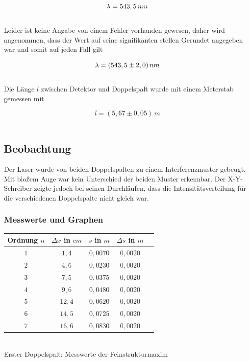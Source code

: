 \documentclass{article}
\begin{document}
\begin{equation}
\lambda = 543,5\,nm
\notag
\end{equation}\\

Leider ist keine Angabe von einem Fehler vorhanden gewesen, daher wird angenommen, dass der Wert auf seine signifikanten stellen Gerundet  angegeben war und somit auf jeden Fall gilt 

\begin{equation}
\lambda = (543,5 \pm 2,0)\,nm
\notag
\end{equation}\\

Die Länge \(l\) zwischen Detektor und Doppelspalt wurde mit einem Meterstab gemessen mit

\begin{equation}
l = (5,67 \pm 0,05)\, m
\end{equation}\\

\subsection{Beobachtung}
Der Laser wurde von beiden Doppelspalten zu einem Interferenzmuster gebeugt. Mit bloßem Auge war kein Unterschied der beiden Muster erkennbar. Der X-Y-Schreiber zeigte jedoch bei seinen Durchläufen, dass die Intensitätsverteilung für die verschiedenen Doppelspalte nicht gleich war.

\subsubsection{Messwerte und Graphen}

\begin{center}
\begin{tabular}{|c|c|c|c|c|}
\hline
Ordnung \(n\) & \(\Delta x \) in \(cm\) & \(s\) in \(m\) & \(\Delta s\) in \(m\) \\
\hline
\( 1 \) & \( 1,4 \) & \( 0,0070 \) & \(0,0020\) \\
\( 2 \) & \( 4,6 \) & \( 0,0230 \) & \(0,0020\) \\
\( 3 \) & \( 7,5 \) & \( 0,0375 \) & \(0,0020\) \\
\( 4 \) & \( 9,6 \) & \( 0,0480 \) & \(0,0020\) \\
\( 5 \) & \( 12,4 \) & \( 0,0620 \) & \(0,0020\) \\
\( 6 \) & \( 14,5 \) & \( 0,0725 \) & \(0,0020\) \\
\( 7 \) & \( 16,6 \) & \( 0,0830 \) & \(0,0020\) \\
\hline
\end{tabular}
\\
Erster Doppelspalt: Messwerte der Feinstrukturmaxim
\end{center}
\end{document}
